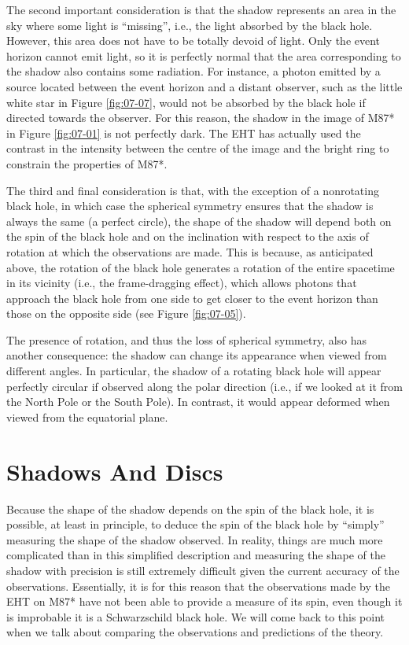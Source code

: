 The second important consideration is that the shadow represents an area in the sky
where some light is ``missing'', i.e., the light absorbed by the black hole. However,
this area does not have to be totally devoid of light. Only the event horizon cannot
emit light, so it is perfectly normal that the area corresponding to the shadow also
contains some radiation. For instance, a photon emitted by a source located between the
event horizon and a distant observer, such as the little white star in Figure \ref{fig:07-07}, would
not be absorbed by the black hole if directed towards the observer. For this reason, the
shadow in the image of M87* in Figure \ref{fig:07-01} is not perfectly dark. The
EHT has actually used the contrast in the intensity between the centre of the image and
the bright ring to constrain the properties of M87*.

The third and final consideration is that, with the exception of a nonrotating black
hole, in which case the spherical symmetry ensures that the
shadow is always the same (a perfect circle), the shape of the shadow
will depend both on the spin of the black hole and on the inclination with respect to
the axis of rotation at which the observations are made. This is because, as anticipated
above, the rotation of the black hole generates a rotation of the entire spacetime in
its vicinity (i.e., the frame-dragging effect), which allows photons that approach the
black hole from one side to get closer to the event horizon than those on the opposite
side (see Figure \ref{fig:07-05}).

The presence of rotation, and thus the loss of spherical symmetry,
also has another consequence: the shadow can change its appearance when viewed from
different angles. In particular, the shadow of a rotating black hole will appear
perfectly circular if observed along the polar direction (i.e., if we looked at it from
the North Pole or the South Pole). In contrast, it would appear deformed when viewed
from the equatorial plane.

\section{Shadows And Discs}\label{sec:07-discs}

Because the shape of the shadow depends on the spin of the black
hole, it is possible, at least in principle, to deduce the spin of the black hole by
``simply'' measuring the shape of the shadow observed. In reality, things are much more
complicated than in this simplified description and measuring the shape of the shadow
with precision is still extremely difficult given the current accuracy of the
observations. Essentially, it is for this reason that the observations made by the EHT
on M87* have not been able to provide a measure of its spin, even
though it is improbable it is a Schwarzschild black hole. We will
come back to this point when we talk about comparing the observations and predictions of
the theory.

